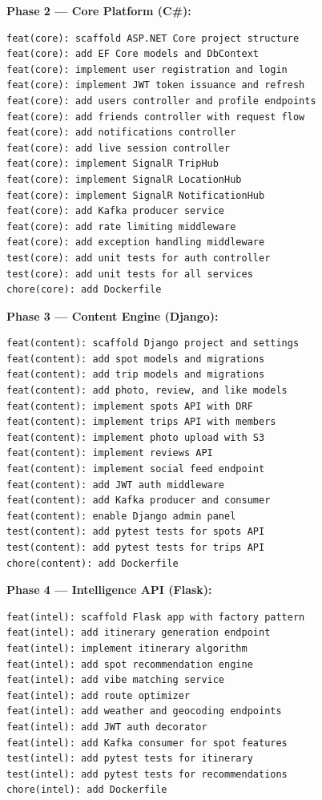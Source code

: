 \documentclass[12pt,letterpaper]{article}
\begin{document}
\textbf{Phase 2 --- Core Platform (C\#):}
\begin{lstlisting}[style=code]
feat(core): scaffold ASP.NET Core project structure
feat(core): add EF Core models and DbContext
feat(core): implement user registration and login
feat(core): implement JWT token issuance and refresh
feat(core): add users controller and profile endpoints
feat(core): add friends controller with request flow
feat(core): add notifications controller
feat(core): add live session controller
feat(core): implement SignalR TripHub
feat(core): implement SignalR LocationHub
feat(core): implement SignalR NotificationHub
feat(core): add Kafka producer service
feat(core): add rate limiting middleware
feat(core): add exception handling middleware
test(core): add unit tests for auth controller
test(core): add unit tests for all services
chore(core): add Dockerfile
\end{lstlisting}

\textbf{Phase 3 --- Content Engine (Django):}
\begin{lstlisting}[style=code]
feat(content): scaffold Django project and settings
feat(content): add spot models and migrations
feat(content): add trip models and migrations
feat(content): add photo, review, and like models
feat(content): implement spots API with DRF
feat(content): implement trips API with members
feat(content): implement photo upload with S3
feat(content): implement reviews API
feat(content): implement social feed endpoint
feat(content): add JWT auth middleware
feat(content): add Kafka producer and consumer
feat(content): enable Django admin panel
test(content): add pytest tests for spots API
test(content): add pytest tests for trips API
chore(content): add Dockerfile
\end{lstlisting}

\textbf{Phase 4 --- Intelligence API (Flask):}
\begin{lstlisting}[style=code]
feat(intel): scaffold Flask app with factory pattern
feat(intel): add itinerary generation endpoint
feat(intel): implement itinerary algorithm
feat(intel): add spot recommendation engine
feat(intel): add vibe matching service
feat(intel): add route optimizer
feat(intel): add weather and geocoding endpoints
feat(intel): add JWT auth decorator
feat(intel): add Kafka consumer for spot features
test(intel): add pytest tests for itinerary
test(intel): add pytest tests for recommendations
chore(intel): add Dockerfile
\end{lstlisting}
\end{document}
